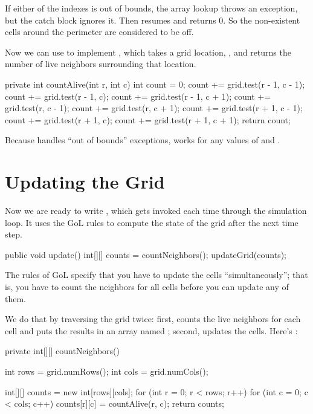If either of the indexes is out of bounds, the array lookup throws an exception, but the catch block ignores it.
Then  resumes and returns 0.
So the non-existent cells around the perimeter are considered to be off.

Now we can use  to implement , which takes a grid location, , and returns the number of live neighbors surrounding that location.

\begin{code}
private int countAlive(int r, int c) {
    int count = 0;
    count += grid.test(r - 1, c - 1);
    count += grid.test(r - 1, c);
    count += grid.test(r - 1, c + 1);
    count += grid.test(r, c - 1);
    count += grid.test(r, c + 1);
    count += grid.test(r + 1, c - 1);
    count += grid.test(r + 1, c);
    count += grid.test(r + 1, c + 1);
    return count;
}
\end{code}

Because  handles ``out of bounds'' exceptions,  works for any values of  and .


\section{Updating the Grid}
\label{sec:update}

Now we are ready to write , which gets invoked each time through the simulation loop.
It uses the GoL rules to compute the state of the grid after the next time step.

\begin{code}
public void update() {
    int[][] counts = countNeighbors();
    updateGrid(counts);
}
\end{code}

The rules of GoL specify that you have to update the cells ``simultaneously''; that is, you have to count the neighbors for all cells before you can update any of them.

We do that by traversing the grid twice: first,  counts the live neighbors for each cell and puts the results in an array named ; second,  updates the cells.
Here's :

\begin{code}
private int[][] countNeighbors() {
    int rows = grid.numRows();
    int cols = grid.numCols();

    int[][] counts = new int[rows][cols];
    for (int r = 0; r < rows; r++) {
        for (int c = 0; c < cols; c++) {
            counts[r][c] = countAlive(r, c);
        }
    }
    return counts;
}
\end{code}

